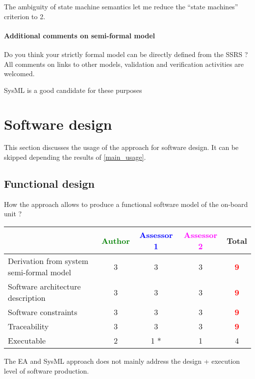 \begin{assessor1}
The ambiguity of state machine semantics let me reduce the "`state machines"' criterion to 2. 
\end{assessor1}


\paragraph{Additional comments on semi-formal  model} Do you think your strictly formal  model can be directly defined from the SSRS ?
All comments on links to  other models, validation and verification activities are welcomed.

\begin{author_comment}
SysML is a good candidate for these purposes
\end{author_comment}
\section{Software design}
This section discusses the usage of the approach for software design.
It can be skipped depending the results of \ref{main_usage}.

\subsection{Functional design}

How the approach allows to  produce a functional software model of the on-board unit ?

\begin{tabular}{|l | c | c | c | c|}
\hline
& \textcolor{green}{Author} & \textcolor{blue}{Assessor 1} & \textcolor{magenta}{Assessor 2} & Total \\
\hline
Derivation from system semi-formal model  &3 & 3    & 3    & \textcolor{red}{\textbf{9}} \\
\hline 
Software architecture description  &3 & 3    & 3    & \textcolor{red}{\textbf{9}} \\
\hline
Software constraints  &3 & 3    & 3    & \textcolor{red}{\textbf{9}} \\
\hline
Traceability  &3 & 3    &3 & \textcolor{red}{\textbf{9}} \\
\hline
Executable  &2 & 1    *& 1    & 4     \\
\hline
\end{tabular}

\begin{assessor1}
The EA and SysML approach does not mainly address the design + execution level of software production. 
\end{assessor1}

